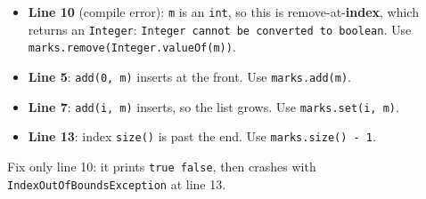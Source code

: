 \documentclass[aspectratio=169]{beamer}
\newcommand{\code}[1]{\texttt{#1}}
\begin{document}
\begin{frame}
\begin{columns}[T,onlytextwidth]
\begin{onlyenv}
\begin{itemize}[itemsep=0.25em, leftmargin=1em]
      \footnotesize
      \item \textbf{Line 10} (compile error): \code{m} is an \code{int}, so this is
            remove-at-\textbf{index}, which returns an \code{Integer}:
            \code{Integer cannot be converted to boolean}. Use
            \code{marks.remove(Integer.valueOf(m))}.
      \item \textbf{Line 5}: \code{add(0, m)} inserts at the front. Use
            \code{marks.add(m)}.
      \item \textbf{Line 7}: \code{add(i, m)} inserts, so the list grows. Use
            \code{marks.set(i, m)}.
      \item \textbf{Line 13}: index \code{size()} is past the end. Use
            \code{marks.size() - 1}.
    \end{itemize}
    {\footnotesize Fix only line 10: it prints \code{true false}, then crashes with
    \code{IndexOutOfBoundsException} at line 13.}
    \end{onlyenv}
  \end{columns}
\end{frame}
\end{document}
